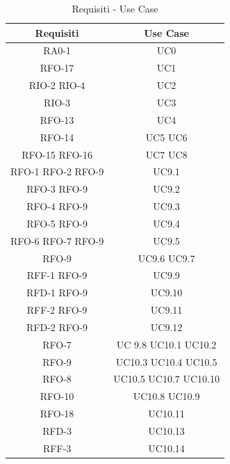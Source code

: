 \begin{table}[h]
\begin{center}
     \begin{tabular}
           {@{\extracolsep{\fill}}|c|c|}
     \hline
      \textbf{Requisiti} & \textbf{Use Case} \\
      \hline
     RA0-1 & UC0 \\
     \hline
     RFO-17 & UC1  \\
     \hline
     RIO-2  RIO-4 & UC2\\
     \hline
     RIO-3 & UC3 \\
     \hline
     RFO-13 & UC4 \\
     \hline
     RFO-14 & UC5 UC6 \\
      \hline
     RFO-15 RFO-16 & UC7 UC8 \\
     \hline
     RFO-1 RFO-2 RFO-9 & UC9.1 \\
     \hline
     RFO-3 RFO-9 &  UC9.2 \\
     \hline
     RFO-4 RFO-9 & UC9.3 \\
     \hline
     RFO-5 RFO-9 & UC9.4 \\
     \hline
     RFO-6 RFO-7 RFO-9 & UC9.5 \\
     \hline
     RFO-9 & UC9.6 UC9.7 \\
     \hline
     RFF-1 RFO-9 & UC9.9 \\
     \hline
     RFD-1 RFO-9 & UC9.10 \\
     \hline
     RFF-2 RFO-9 & UC9.11 \\
     \hline 
     RFD-2 RFO-9 & UC9.12 \\
     \hline
     RFO-7 & UC 9.8 UC10.1 UC10.2 \\
     \hline
     RFO-9 & UC10.3 UC10.4 UC10.5 \\
     \hline
     RFO-8 & UC10.5 UC10.7 UC10.10 \\
     \hline
     RFO-10 & UC10.8 UC10.9 \\
     \hline
     RFO-18 & UC10.11 \\
     \hline
     RFD-3 & UC10.13 \\
     \hline
     RFF-3 & UC10.14 \\
     
    \hline %
    \end{tabular}
  \caption{Requisiti - Use Case} %
  \label{tab:requisiti}
  \end{center}
\end{table}
